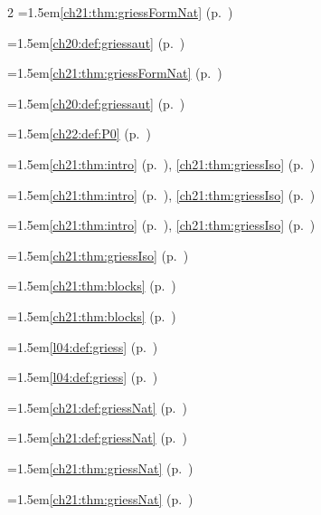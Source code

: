 \begin{multicols}{2}
\hangindent=1.5em\quad \ref{ch21:thm:griessFormNat} (p.~\pageref{ch21:thm:griessFormNat})\par
\hangindent=1.5em\quad \ref{ch20:def:griessaut} (p.~\pageref{ch20:def:griessaut})\par
\hangindent=1.5em\quad \ref{ch21:thm:griessFormNat} (p.~\pageref{ch21:thm:griessFormNat})\par
\hangindent=1.5em\quad \ref{ch20:def:griessaut} (p.~\pageref{ch20:def:griessaut})\par
\hangindent=1.5em\quad \ref{ch22:def:P0} (p.~\pageref{ch22:def:P0})\par
\hangindent=1.5em\quad \ref{ch21:thm:intro} (p.~\pageref{ch21:thm:intro}), \ref{ch21:thm:griessIso} (p.~\pageref{ch21:thm:griessIso})\par
\hangindent=1.5em\quad \ref{ch21:thm:intro} (p.~\pageref{ch21:thm:intro}), \ref{ch21:thm:griessIso} (p.~\pageref{ch21:thm:griessIso})\par
\hangindent=1.5em\quad \ref{ch21:thm:intro} (p.~\pageref{ch21:thm:intro}), \ref{ch21:thm:griessIso} (p.~\pageref{ch21:thm:griessIso})\par
\hangindent=1.5em\quad \ref{ch21:thm:griessIso} (p.~\pageref{ch21:thm:griessIso})\par
\hangindent=1.5em\quad \ref{ch21:thm:blocks} (p.~\pageref{ch21:thm:blocks})\par
\hangindent=1.5em\quad \ref{ch21:thm:blocks} (p.~\pageref{ch21:thm:blocks})\par
\hangindent=1.5em\quad \ref{l04:def:griess} (p.~\pageref{l04:def:griess})\par
\hangindent=1.5em\quad \ref{l04:def:griess} (p.~\pageref{l04:def:griess})\par
\hangindent=1.5em\quad \ref{ch21:def:griessNat} (p.~\pageref{ch21:def:griessNat})\par
\hangindent=1.5em\quad \ref{ch21:def:griessNat} (p.~\pageref{ch21:def:griessNat})\par
\hangindent=1.5em\quad \ref{ch21:thm:griessNat} (p.~\pageref{ch21:thm:griessNat})\par
\hangindent=1.5em\quad \ref{ch21:thm:griessNat} (p.~\pageref{ch21:thm:griessNat})\par

\end{multicols}
